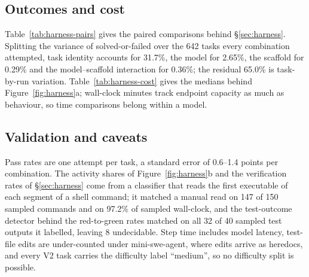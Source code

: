 \subsection{Outcomes and cost}


Table~\ref{tab:harness-pairs} gives the paired comparisons behind \S\ref{sec:harness}. Splitting the variance of solved-or-failed over the 642 tasks every combination attempted, task identity accounts for 31.7\%, the model for 2.65\%, the scaffold for 0.29\% and the model--scaffold interaction for 0.36\%; the residual 65.0\% is task-by-run variation. Table~\ref{tab:harness-cost} gives the medians behind Figure~\ref{fig:harness}a; wall-clock minutes track endpoint capacity as much as behaviour, so time comparisons belong within a model.

\subsection{Validation and caveats}
\label{app:harness-validation}
Pass rates are one attempt per task, a standard error of 0.6--1.4 points per combination. The activity shares of Figure~\ref{fig:harness}b and the verification rates of \S\ref{sec:harness} come from a classifier that reads the first executable of each segment of a shell command; it matched a manual read on 147 of 150 sampled commands and on 97.2\% of sampled wall-clock, and the test-outcome detector behind the red-to-green rates matched on all 32 of 40 sampled test outputs it labelled, leaving 8 undecidable. Step time includes model latency, test-file edits are under-counted under mini-swe-agent, where edits arrive as heredocs, and every V2 task carries the difficulty label ``medium'', so no difficulty split is possible.
